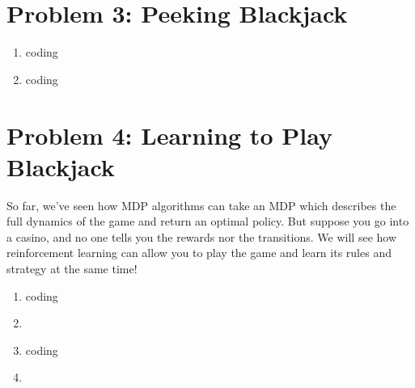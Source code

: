 \documentclass[10pt]{article}
\begin{document}
\section*{\normalsize Problem 3: Peeking Blackjack}

\begin{enumerate}[label=(\alph*)]

  \item coding
  
  \item coding
		
\end{enumerate}

\section*{\normalsize Problem 4: Learning to Play Blackjack}

So far, we've seen how MDP algorithms can take an MDP which describes the full dynamics of the game and return an optimal policy. But suppose you go into a casino, and no one tells you the rewards nor the transitions. We will see how reinforcement learning can allow you to play the game and learn its rules and strategy at the same time!

\begin{enumerate}[label=(\alph*)]

  \item coding
  
  \item
  
  \item coding
  
  \item
		
\end{enumerate}
\end{document}
